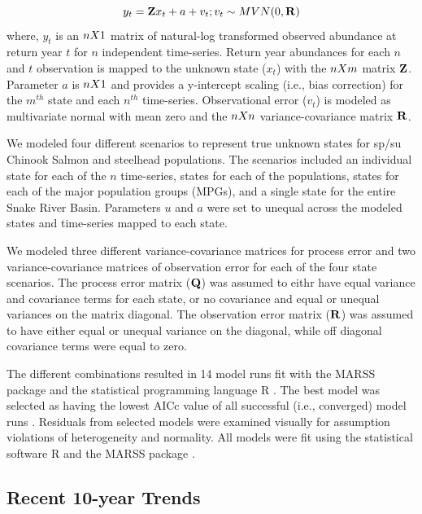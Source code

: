 \documentclass[12pt,a4paper]{article}
\begin{document}
\[
y_t = \mathbf{Z}x_t + a + v_t; \\
v_t \sim MVN(0,\mathbf{R})
\]
where, \(y_t\) is an \(n \space X \space 1\) matrix of natural-log transformed observed abundance at return year \(t\) for \(n\) independent time-series. Return year abundances for each \(n\) and \(t\) observation is mapped to the unknown state (\(x_t\)) with the \(n \space X \space m\) matrix \(\bf{Z}\). Parameter \(a\) is \(n \space X \space 1\) and provides a y-intercept scaling (i.e., bias correction) for the \(m^{th}\) state and each \(n^{th}\) time-series. Observational error (\(v_t\)) is modeled as multivariate normal with mean zero and the \(n \space X \space n\) variance-covariance matrix \(\bf{R}\).

We modeled four different scenarios to represent true unknown states for sp/su Chinook Salmon and steelhead populations. The scenarios included an individual state for each of the \(n\) time-series, states for each of the populations, states for each of the major population groups (MPGs), and a single state for the entire Snake River Basin. Parameters \(u\) and \(a\) were set to unequal across the modeled states and time-series mapped to each state.

We modeled three different variance-covariance matrices for process error and two variance-covariance matrices of observation error for each of the four state scenarios. The process error matrix (\(\bf{Q}\)) was assumed to eithr have equal variance and covariance terms for each state, or no covariance and equal or unequal variances on the matrix diagonal. The observation error matrix (\(\bf{R}\)) was assumed to have either equal or unequal variance on the diagonal, while off diagonal covariance terms were equal to zero.

The different combinations resulted in 14 model runs fit with the MARSS package \autocite{holmes_marss_2012} and the statistical programming language R \autocite{R-base}. The best model was selected as having the lowest AICc value of all successful (i.e., converged) model runs \autocite{holmes_marss_2012,R-MARSS}. Residuals from selected models were examined visually for assumption violations of heterogeneity and normality. All models were fit using the statistical software R \autocite{R-base} and the MARSS package \autocite{holmes_marss_2012,R-MARSS}.

\subsection{Recent 10-year Trends}\label{recent-10-year-trends}
\end{document}
